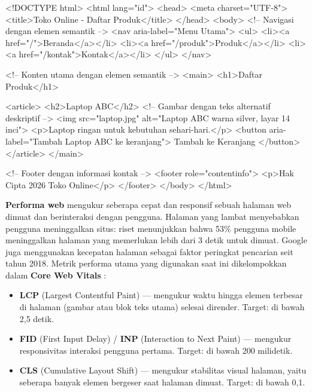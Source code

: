 \begin{webcode}[language=HTML, caption={Contoh HTML dengan praktik aksesibilitas yang baik}]
<!DOCTYPE html>
<html lang="id">
<head>
  <meta charset="UTF-8">
  <title>Toko Online - Daftar Produk</title>
</head>
<body>
  <!-- Navigasi dengan elemen semantik -->
  <nav aria-label="Menu Utama">
    <ul>
      <li><a href="/">Beranda</a></li>
      <li><a href="/produk">Produk</a></li>
      <li><a href="/kontak">Kontak</a></li>
    </ul>
  </nav>

  <!-- Konten utama dengan elemen semantik -->
  <main>
    <h1>Daftar Produk</h1>

    <article>
      <h2>Laptop ABC</h2>
      <!-- Gambar dengan teks alternatif deskriptif -->
      <img src="laptop.jpg"
           alt="Laptop ABC warna silver, layar 14 inci">
      <p>Laptop ringan untuk kebutuhan sehari-hari.</p>
      <button aria-label="Tambah Laptop ABC ke keranjang">
        Tambah ke Keranjang
      </button>
    </article>
  </main>

  <!-- Footer dengan informasi kontak -->
  <footer role="contentinfo">
    <p>Hak Cipta 2026 Toko Online</p>
  </footer>
</body>
</html>
\end{webcode}

\textbf{Performa web} mengukur seberapa cepat dan responsif sebuah halaman web dimuat dan berinteraksi dengan pengguna. Halaman yang lambat menyebabkan pengguna meninggalkan situs: riset menunjukkan bahwa 53\% pengguna mobile meninggalkan halaman yang memerlukan lebih dari 3 detik untuk dimuat. Google juga menggunakan kecepatan halaman sebagai faktor peringkat pencarian seit tahun 2018. Metrik performa utama yang digunakan saat ini dikelompokkan dalam \textbf{Core Web Vitals} \cite{webdevLearn}:

\begin{itemize}
  \item \textbf{LCP} (Largest Contentful Paint) --- mengukur waktu hingga elemen terbesar di halaman (gambar atau blok teks utama) selesai dirender. Target: di bawah 2,5 detik.
  \item \textbf{FID} (First Input Delay) / \textbf{INP} (Interaction to Next Paint) --- mengukur responsivitas interaksi pengguna pertama. Target: di bawah 200 milidetik.
  \item \textbf{CLS} (Cumulative Layout Shift) --- mengukur stabilitas visual halaman, yaitu seberapa banyak elemen bergeser saat halaman dimuat. Target: di bawah 0,1.
\end{itemize}

